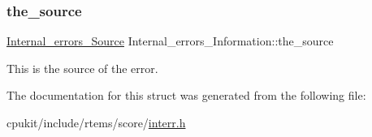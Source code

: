 \subsubsection{\texorpdfstring{the\_source}{the\_source}}
{\footnotesize\ttfamily \mbox{\hyperlink{group__RTEMSScoreIntErr_ga878b4de77df7d0b83d19609d4de42c26}{Internal\+\_\+errors\+\_\+\+Source}} Internal\+\_\+errors\+\_\+\+Information\+::the\+\_\+source}

This is the source of the error. 

The documentation for this struct was generated from the following file\+:\begin{DoxyCompactItemize}
\item 
cpukit/include/rtems/score/\mbox{\hyperlink{interr_8h}{interr.\+h}}\end{DoxyCompactItemize}
